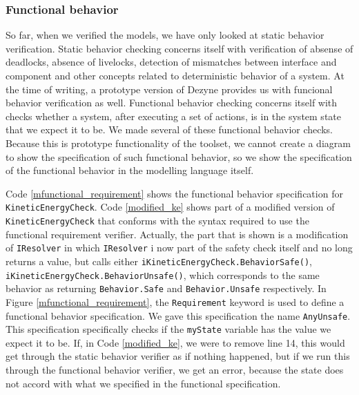 \documentclass[12pt]{scrreprt}
\begin{document}
\subsubsection{Functional behavior}
So far, when we verified the models, we have only looked at static behavior verification. Static behavior checking concerns itself with verification of absense of deadlocks, absence of livelocks, detection of mismatches between interface and component and other concepts related to deterministic behavior of a system. At the time of writing, a prototype version of Dezyne provides us with funcional behavior verification as well. Functional behavior checking concerns itself with checks whether a system, after executing a set of actions, is in the system state that we expect it to be. We made several of these functional behavior checks. Because this is prototype functionality of the toolset, we cannot create a diagram to show the specification of such functional behavior, so we show the specification of the functional behavior in the modelling language itself.
\par
Code \ref{mfunctional_requirement} shows the functional behavior specification for \texttt{KineticEnergyCheck}. Code \ref{modified_ke} shows part of a modified version of \texttt{KineticEnergyCheck} that conforms with the syntax required to use the functional requirement verifier. Actually, the part that is shown is a modification of \texttt{IResolver} in which \texttt{IResolver} i now part of the safety check itself and no long returns a value, but calls either \texttt{iKineticEnergyCheck.BehaviorSafe()}, \texttt{iKineticEnergyCheck.BehaviorUnsafe()}, which corresponds to the same behavior as returning \texttt{Behavior.Safe} and \texttt{Behavior.Unsafe} respectively. In Figure \ref{mfunctional_requirement}, the \texttt{Requirement} keyword is used to define a functional behavior specification. We gave this specification the name \texttt{AnyUnsafe}. This specification specifically checks if the \texttt{myState} variable has the value we expect it to be. If, in Code \ref{modified_ke}, we were to remove line 14, this would get through the static behavior verifier as if nothing happened, but if we run this through the functional behavior verifier, we get an error, because the state does not accord with what we specified in the functional specification.
\end{document}
